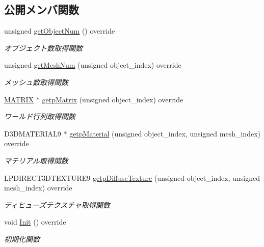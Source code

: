 \subsection*{公開メンバ関数}
\begin{DoxyCompactItemize}
\item 
unsigned \mbox{\hyperlink{class_stencil_shadow_test_draw_ad93f1c8a60a701d185108896c58dd578}{get\+Object\+Num}} () override
\begin{DoxyCompactList}\small\item\em オブジェクト数取得関数 \end{DoxyCompactList}\item 
unsigned \mbox{\hyperlink{class_stencil_shadow_test_draw_a285b3045ff5cc34b6b2b991cca434bb3}{get\+Mesh\+Num}} (unsigned object\+\_\+index) override
\begin{DoxyCompactList}\small\item\em メッシュ数取得関数 \end{DoxyCompactList}\item 
\mbox{\hyperlink{_matrix_8h_a032295cd9fb1b711757c90667278e744}{M\+A\+T\+R\+IX}} $\ast$ \mbox{\hyperlink{class_stencil_shadow_test_draw_a8ab105b75d673adc52698a8401c6525c}{getp\+Matrix}} (unsigned object\+\_\+index) override
\begin{DoxyCompactList}\small\item\em ワールド行列取得関数 \end{DoxyCompactList}\item 
D3\+D\+M\+A\+T\+E\+R\+I\+A\+L9 $\ast$ \mbox{\hyperlink{class_stencil_shadow_test_draw_aacdc680646f832451ea575f1da1eec9a}{getp\+Material}} (unsigned object\+\_\+index, unsigned mesh\+\_\+index) override
\begin{DoxyCompactList}\small\item\em マテリアル取得関数 \end{DoxyCompactList}\item 
L\+P\+D\+I\+R\+E\+C\+T3\+D\+T\+E\+X\+T\+U\+R\+E9 \mbox{\hyperlink{class_stencil_shadow_test_draw_a5c74550a8e0eccf29f3c93e5027e492e}{getp\+Diffuse\+Texture}} (unsigned object\+\_\+index, unsigned mesh\+\_\+index) override
\begin{DoxyCompactList}\small\item\em ディヒューズテクスチャ取得関数 \end{DoxyCompactList}\item 
void \mbox{\hyperlink{class_stencil_shadow_test_draw_a65be72e71cd12cacf315b0364c12c3e3}{Init}} () override
\begin{DoxyCompactList}\small\item\em 初期化関数 \end{DoxyCompactList}\item 

\end{DoxyCompactItemize}
